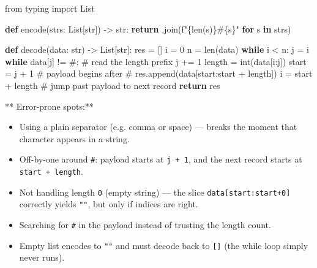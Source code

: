 \documentclass[11pt]{article}
\providecommand{\tightlist}{\setlength{\itemsep}{1pt}\setlength{\parskip}{0pt}}
\newenvironment{Shaded}{\begin{snugshade}}{\end{snugshade}}
\newcommand{\BuiltInTok}[1]{\textcolor[rgb]{0.50,0.55,0.55}{#1}}
\newcommand{\CommentTok}[1]{\textcolor[rgb]{0.48,0.49,0.49}{#1}}
\newcommand{\ControlFlowTok}[1]{\textcolor[rgb]{0.99,0.74,0.29}{\textbf{#1}}}
\newcommand{\DecValTok}[1]{\textcolor[rgb]{0.96,0.45,0.00}{#1}}
\newcommand{\ImportTok}[1]{\textcolor[rgb]{0.15,0.68,0.38}{#1}}
\newcommand{\KeywordTok}[1]{\textcolor[rgb]{0.81,0.81,0.76}{\textbf{#1}}}
\newcommand{\NormalTok}[1]{\textcolor[rgb]{0.81,0.81,0.76}{#1}}
\newcommand{\OperatorTok}[1]{\textcolor[rgb]{0.81,0.81,0.76}{#1}}
\newcommand{\SpecialCharTok}[1]{\textcolor[rgb]{0.24,0.68,0.91}{#1}}
\newcommand{\SpecialStringTok}[1]{\textcolor[rgb]{0.85,0.27,0.33}{#1}}
\newcommand{\StringTok}[1]{\textcolor[rgb]{0.96,0.31,0.31}{#1}}
\begin{document}
\begin{Shaded}
\begin{Highlighting}[]
\ImportTok{from}\NormalTok{ typing }\ImportTok{import}\NormalTok{ List}

\KeywordTok{def}\NormalTok{ encode(strs: List[}\BuiltInTok{str}\NormalTok{]) }\OperatorTok{{-}\textgreater{}} \BuiltInTok{str}\NormalTok{:}
    \ControlFlowTok{return} \StringTok{\textquotesingle{}\textquotesingle{}}\NormalTok{.join(}\SpecialStringTok{f"}\SpecialCharTok{\{}\BuiltInTok{len}\NormalTok{(s)}\SpecialCharTok{\}}\SpecialStringTok{\#}\SpecialCharTok{\{}\NormalTok{s}\SpecialCharTok{\}}\SpecialStringTok{"} \ControlFlowTok{for}\NormalTok{ s }\KeywordTok{in}\NormalTok{ strs)}

\KeywordTok{def}\NormalTok{ decode(data: }\BuiltInTok{str}\NormalTok{) }\OperatorTok{{-}\textgreater{}}\NormalTok{ List[}\BuiltInTok{str}\NormalTok{]:}
\NormalTok{    res }\OperatorTok{=}\NormalTok{ []}
\NormalTok{    i }\OperatorTok{=} \DecValTok{0}
\NormalTok{    n }\OperatorTok{=} \BuiltInTok{len}\NormalTok{(data)}
    \ControlFlowTok{while}\NormalTok{ i }\OperatorTok{\textless{}}\NormalTok{ n:}
\NormalTok{        j }\OperatorTok{=}\NormalTok{ i}
        \ControlFlowTok{while}\NormalTok{ data[j] }\OperatorTok{!=} \StringTok{\textquotesingle{}\#\textquotesingle{}}\NormalTok{:       }\CommentTok{\# read the length prefix}
\NormalTok{            j }\OperatorTok{+=} \DecValTok{1}
\NormalTok{        length }\OperatorTok{=} \BuiltInTok{int}\NormalTok{(data[i:j])}
\NormalTok{        start }\OperatorTok{=}\NormalTok{ j }\OperatorTok{+} \DecValTok{1}               \CommentTok{\# payload begins after \textquotesingle{}\#\textquotesingle{}}
\NormalTok{        res.append(data[start:start }\OperatorTok{+}\NormalTok{ length])}
\NormalTok{        i }\OperatorTok{=}\NormalTok{ start }\OperatorTok{+}\NormalTok{ length          }\CommentTok{\# jump past payload to next record}
    \ControlFlowTok{return}\NormalTok{ res}
\end{Highlighting}
\end{Shaded}

** Error-prone spots:**

\begin{itemize}
\tightlist
\item
  Using a plain separator (e.g. comma or space) --- breaks the moment that character appears in a string.
\item
  Off-by-one around \texttt{\#}: payload starts at \texttt{j\ +\ 1}, and the next record starts at \texttt{start\ +\ length}.
\item
  Not handling length \texttt{0} (empty string) --- the slice \texttt{data{[}start:start+0{]}} correctly yields \texttt{""}, but only if indices are right.
\item
  Searching for \texttt{\#} in the payload instead of trusting the length count.
\item
  Empty list encodes to \texttt{""} and must decode back to \texttt{{[}{]}} (the while loop simply never runs).
\end{itemize}
\end{document}
